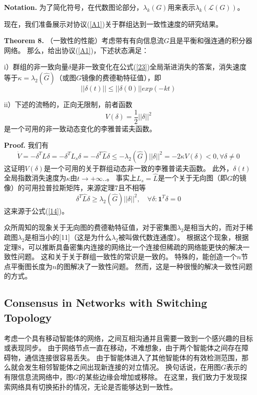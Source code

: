 \documentclass{article}
\begin{document}
\noindent\textbf{Notation.} 为了简化符号，在代数图论部分，$\lambda_k(G)$用来表示$\lambda_k(\mathcal{L}(G))$。

现在，我们准备展示对协议(\ref{A1})关于群组达到一致性速度的研究结果。

\noindent\textbf{Theorem 8.} （一致性的性能）考虑带有有向信息流$G$且是平衡和强连通的积分器网络。
那么，给出协议(\ref{A1})，下述状态满足：

i）群组的非一致向量$\delta$是非一致变化在公式(\ref{23})全局渐进消失的答案，消失速度等于$\kappa=\lambda_2(\hat{G})$（或图$G$镜像的费德勒特征值），即
\begin{equation}
    \tag{27}
    \label{27}
    ||\delta(t)||\le ||\delta(0)||exp(-kt)
\end{equation}

ii）下述的流畅的，正向无限制，前者函数
\begin{equation}
    \tag{28}
    \label{28}
    V(\delta) = \frac{1}{2}||\delta||^2
\end{equation}
是一个可用的非一致动态变化的李雅普诺夫函数。

\noindent\textbf{Proof.} 我们有
\begin{equation}
    \tag{29}
    \label{29}
    \dot{V} = -\delta^TL\delta = -\delta^TL_s\delta = -\delta^T\hat{L}\delta \le -\lambda_2(\hat{G})||\delta||^2 = -2\kappa V(\delta) < 0, \forall \delta \ne 0
\end{equation}
这证明$V(\delta)$是一个可用的关于群组动态非一致的李雅普诺夫函数。
此外，$\delta(t)$全局指数消失速度为$\kappa$由$t\rightarrow +\infty ..$。
事实上$L_s = \hat{L}$是一个关于无向图（即$G$的镜像）的可用拉普拉斯矩阵，来源定理7且不相等
\begin{equation}
    \tag{30}
    \label{30}
    \delta^T \hat{L} \delta \ge \lambda_2(\hat{G})||\delta||^2,\quad \forall\delta:\mathbf{1}^T\delta=0
\end{equation}
这来源于公式(\ref{14})。

众所周知的现象关于无向图的费德勒特征值，对于密集图$\lambda_2$是相当大的，而对于稀疏图$\lambda_2$是相当小的[11]（这是为什么$\lambda_2$被叫做代数连通度）。
根据这个现象，根据定理8，可以推断具备密集内连接的网络比一个连接但稀疏的网络能更快的解决一致性问题。
这和关于关于群组一致性的常识是一致的。
特殊的，能创造一个$n$节点平衡图长度为$n$的图解决了一致性问题。
然而，这是一种很慢的解决一致性问题的方式。


\subsection{Consensus in Networks with Switching Topology}
考虑一个具有移动智能体的网络，之间互相沟通并且需要一致到一个感兴趣的目标或表现同步。
由于网络节点一直在移动，不难想象，由于两个智能体之间存在障碍物，通信连接很容易丢失。
由于智能体进入了其他智能体的有效检测范围，那么就会发生相邻智能体之间出现新连接的对立情况。
换句话说，在用图$G$表示的有限信息流网络中，图$G$的某些边缘会增加或移除。
在这里，我们致力于发现探索网络具有切换拓扑的情况，无论是否能够达到一致性。
\end{document}
